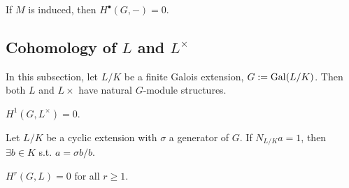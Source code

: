 \begin{proposition}
    If $M$ is induced, then $H^\bullet(G, -) = 0$.
\end{proposition}


\subsection{Cohomology of \texorpdfstring{$L$ and $L^\times$}{PDFstring}}
In this subsection, let $L/K$ be a finite Galois extension, $G := \operatorname{Gal}(L/K)$. Then both $L$ and $L\times$ have natural $G$-module structures.

\begin{proposition}
    $H^1(G, L^\times) = 0$.
\end{proposition}

\begin{corollary}
    Let $L/K$ be a cyclic extension with $\sigma$ a generator of $G$. If $N_{L/K}a = 1$, then $\exists b\in K$ s.t. $a = \sigma b/b$.
\end{corollary}

\begin{proposition}
    $H^r(G, L) = 0$ for all $r \ge 1$.
\end{proposition}


